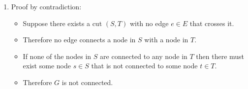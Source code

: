 \documentclass[a4paper, 10pt]{article}
\begin{document}
\begin{enumerate}
	\item Proof by contradiction:
		\begin{itemize}
			\item Suppose there exists a cut $(S, T)$ with no edge $e \in E$
				that crosses it.
			\item Therefore no edge connects a node in $S$ with a node in $T$.
			\item If none of the nodes in $S$ are connected to any node in $T$
				then there must exist some node $s \in S$ that is not connected
				to some node $t \in T$.
			\item Therefore $G$ is not connected.
		\end{itemize}
\end{enumerate}
\end{document}
